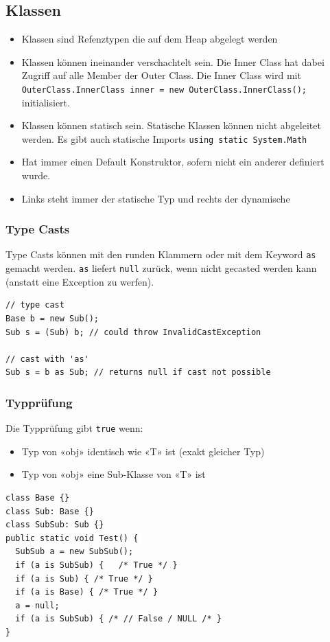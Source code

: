 \documentclass[
a4paper,
oneside,
10pt,
fleqn,
headsepline,
toc=listofnumbered, 
bibliography=totocnumbered]{scrartcl}
\begin{document}
\subsection{Klassen}
\begin{itemize}
	\item Klassen sind Refenztypen die auf dem Heap abgelegt werden
	\item Klassen können ineinander verschachtelt sein. Die Inner Class hat dabei Zugriff auf alle Member der Outer Class. Die Inner Class wird mit \lstinline|OuterClass.InnerClass inner = new OuterClass.InnerClass();| initialisiert.
	\item Klassen können statisch sein. Statische Klassen können nicht abgeleitet werden. Es gibt auch statische Imports \lstinline|using static System.Math|
	\item Hat immer einen Default Konstruktor, sofern nicht ein anderer definiert wurde.
	\item Links steht immer der statische Typ und rechts der dynamische
\end{itemize}

\subsubsection{Type Casts}
Type Casts können mit den runden Klammern oder mit dem Keyword \lstinline|as| gemacht werden. \lstinline|as| liefert \lstinline|null| zurück, wenn nicht gecasted werden kann (anstatt eine Exception zu werfen).
\begin{lstlisting}
// type cast
Base b = new Sub();
Sub s = (Sub) b; // could throw InvalidCastException

// cast with 'as'
Sub s = b as Sub; // returns null if cast not possible

\end{lstlisting}

\subsubsection{Typprüfung}
Die Typprüfung gibt \lstinline|true| wenn:
\begin{itemize}
	\item Typ von «obj» identisch wie «T» ist (exakt gleicher Typ)
	\item Typ von «obj» eine Sub-Klasse von «T» ist
\end{itemize}
\begin{lstlisting}
class Base {}
class Sub: Base {}
class SubSub: Sub {}
public static void Test() {
  SubSub a = new SubSub();
  if (a is SubSub) {   /* True */ }
  if (a is Sub) { /* True */ } 
  if (a is Base) { /* True */ }
  a = null; 
  if (a is SubSub) { /* // False / NULL /* } 
} 
\end{lstlisting}
\end{document}
